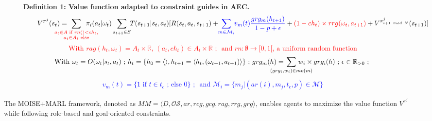\documentclass[sigconf,anonymous]{aamas}
\begin{document}
\begin{figure*}[t]
  \label{eq:single_value_function}
  \raggedright
  \textbf{\quad Definition 1: Value function adapted to constraint guides in AEC.}
  \begin{gather*}
    \text{\quad \quad} V^{\pi^j}(s_t) = \hspace{-0.75cm} \sum_{\textcolor{red}{ \substack{a_{t} \in A \text{ if } rn() < ch_{t}, \\ 
    a_{t} \in A_{t} \text{ else}}
    }}{\hspace{-0.7cm} \pi_i(a_{t} | \omega_t)} \sum_{s_{t+1} \in S}{\hspace{-0.1cm} T(s_{t+1} | s_t, a_{t})[R(s_t,a_{t},s_{t+1}) + \hspace{-0.1cm} \textcolor{blue}{ \sum_{m \in \mathcal{M}_i}{ \hspace{-0.1cm} v_m(t) \frac{grg_m(h_{t+1})}{1 - p + \epsilon} } } + \textcolor{red}{(1-ch_t) \times rrg(\omega_t,a_{t+1})} + V^{\pi^j_{i+1 \ mod \ N}}(s_{t+1})]}
  \end{gather*}  
  \textcolor{red}{\[\text{With } rag(h_t, \omega_t) = A_{t} \times \mathbb{R} \text{, } (a_t, ch_{t}) \in A_{t} \times \mathbb{R} \text{ ; } \text{ and } rn: \emptyset \to [0,1[ \text{, a uniform random function}\]}
  \vspace{-0.5cm}
  \textcolor{blue}{
  \begin{gather*}
  \text{With } \omega_t = O(\omega_t | s_t, a_t) \text{ ; } h_t = \{h_0 = \langle \rangle, h_{t+1} = \langle h_t, (\omega_{t+1}, a_{t+1}) \rangle \} \text{ ; } grg_m(h) = \hspace{-0.8cm} \sum_{(grg_i,w_i) \in mo(m)}{\hspace{-0.8cm} w_i \times grg_i(h)} \text{ ; } \epsilon \in \mathbb{R}_{>0} \text{ ; }
  \end{gather*}
  }
  \vspace{-0.75cm}
  \textcolor{blue}{
  \begin{gather*}
  v_m(t) = \{ 1 \text{ if } t \in t_c \text{ ; else } 0 \} \text{ ; } \text{ and } \mathcal{M}_i = \{m_j | (ar(i),m_j,t_c,p) \in \mathcal{M}\}
  \end{gather*}
  }
  \vspace{-0.6cm}
  \end{figure*}

The MOISE+MARL framework, denoted as $MM = \langle D, \mathcal{OS}, ar, rcg, \allowbreak gcg, rag, rrg, grg \rangle$, enables agents to maximize the value function $V^{\pi^{j}}$ while following role-based and goal-oriented constraints.
\end{document}
